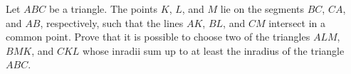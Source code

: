 Let $ABC$ be a triangle. The points $K$, $L$, and $M$ lie on the segments $BC$, $CA$, and $AB$, respectively, such that the lines $AK$, $BL$, and $CM$ intersect in a common point. Prove that it is possible to choose two of the triangles $ALM$, $BMK$, and $CKL$ whose inradii sum up to at least the inradius of the triangle $ABC$.
